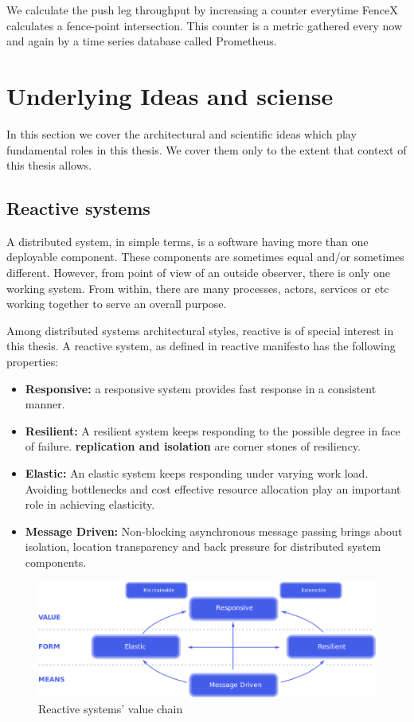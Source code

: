 \documentclass[a4]{report}
\begin{document}
    We calculate the push leg throughput by increasing a counter everytime FenceX calculates a fence-point intersection.
    This counter is a metric gathered every now and again by a time series database called Prometheus.

    \section{Underlying Ideas and sciense}
    In this section we cover the architectural and scientific ideas which play fundamental roles in this thesis.
    We cover them only to the extent that context of this thesis allows.

    \subsection{Reactive systems}
    A distributed system, in simple terms, is a software having more than one deployable component.
    These components are sometimes equal and/or sometimes different.
    However, from point of view of an outside observer, there is only one working system.
    From within, there are many processes, actors, services or etc working together to serve an overall purpose.

    Among distributed systems architectural styles, reactive is of special interest in this thesis.
    A reactive system, as defined in reactive manifesto \cite{reactive-manifesto} has the following properties:
    \begin{itemize}
        \item \textbf{Responsive:} a responsive system provides fast response in a consistent manner.
        \item \textbf{Resilient:} A resilient system keeps responding to the possible degree in face of failure.
        \textbf{replication and isolation} are corner stones of resiliency.
        \item \textbf{Elastic:} An elastic system keeps responding under varying work load. Avoiding bottlenecks and cost
        effective resource allocation play an important role in achieving elasticity.
        \item \textbf{Message Driven:} Non-blocking asynchronous message passing brings about isolation, location
        transparency and back pressure for distributed system components.
    \end{itemize}

    \begin{figure}[ht]
        \caption{Reactive systems' value chain \cite{reactive-manifesto}}
        \label{fig:reactive-value}
        \includegraphics[width=\linewidth, scale=0.4]{images/reactive-traits.png}
    \end{figure}
\end{document}
